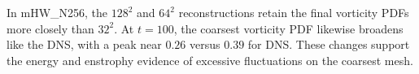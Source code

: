 \documentclass[authoryear,preprint,review,12pt]{elsarticle}
\begin{document}
In mHW\_N256, the $128^2$ and $64^2$ reconstructions retain the final vorticity PDFs more closely than $32^2$. At $t=100$, the coarsest vorticity PDF likewise broadens like the DNS, with a peak near $0.26$ versus $0.39$ for DNS. These changes support the energy and enstrophy evidence of excessive fluctuations on the coarsest mesh.


\end{document}
